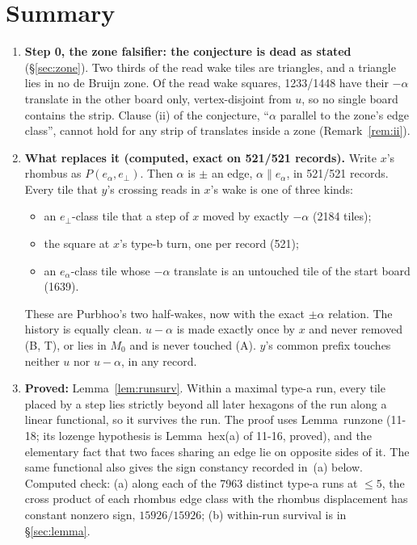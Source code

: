 \documentclass[11pt]{article}
\theoremstyle{definition}\newtheorem{definition}[theorem]{Definition}\newtheorem{remark}[theorem]{Remark}
\begin{document}
\section*{Summary}
\begin{enumerate}
\item \textbf{Step 0, the zone falsifier: the conjecture is dead as stated} (\S\ref{sec:zone}).
Two thirds of the read wake tiles are triangles, and a triangle lies in no de Bruijn zone.
Of the read wake squares, 1233/1448 have their $-\alpha$ translate in the other board only, vertex-disjoint from $u$, so no single board contains the strip.
Clause (ii) of the conjecture, ``$\alpha$ parallel to the zone's edge class'', cannot hold for any strip of translates inside a zone (Remark~\ref{rem:ii}).
\item \textbf{What replaces it (computed, exact on 521/521 records).} Write $x$'s rhombus as $P(e_\alpha,e_\perp)$. Then $\alpha$ is $\pm$ an edge, $\alpha\parallel e_\alpha$, in 521/521 records. Every tile that $y$'s crossing reads in $x$'s wake is one of three kinds:
\begin{itemize}
\item[(B)] an $e_\perp$-class tile that a step of $x$ moved by exactly $-\alpha$ (2184 tiles);
\item[(T)] the square at $x$'s type-b turn, one per record (521);
\item[(A)] an $e_\alpha$-class tile whose $-\alpha$ translate is an untouched tile of the start board (1639).
\end{itemize}
These are Purbhoo's two half-wakes, now with the exact $\pm\alpha$ relation.
The history is equally clean. $u-\alpha$ is made exactly once by $x$ and never removed (B, T), or lies in $M_0$ and is never touched (A). $y$'s common prefix touches neither $u$ nor $u-\alpha$, in any record.
\item \textbf{Proved:} Lemma~\ref{lem:runsurv}. Within a maximal type-a run, every tile placed by a step lies strictly beyond all later hexagons of the run along a linear functional, so it survives the run. The proof uses Lemma~runzone (11-18; its lozenge hypothesis is Lemma~hex(a) of 11-16, proved), and the elementary fact that two faces sharing an edge lie on opposite sides of it. The same functional also gives the sign constancy recorded in~(a) below.
Computed check: (a) along each of the 7963 distinct type-a runs at $\le5$, the cross product of each rhombus edge class with the rhombus displacement has constant nonzero sign, $15926/15926$; (b) within-run survival is in \S\ref{sec:lemma}.

\end{enumerate}
\end{document}
